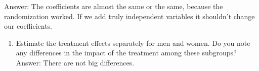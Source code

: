 \documentclass[
]{article}
\newenvironment{Shaded}{\begin{snugshade}}{\end{snugshade}}
\newcommand{\AttributeTok}[1]{\textcolor[rgb]{0.13,0.29,0.53}{#1}}
\newcommand{\CommentTok}[1]{\textcolor[rgb]{0.56,0.35,0.01}{\textit{#1}}}
\newcommand{\ConstantTok}[1]{\textcolor[rgb]{0.56,0.35,0.01}{#1}}
\newcommand{\DecValTok}[1]{\textcolor[rgb]{0.00,0.00,0.81}{#1}}
\newcommand{\FunctionTok}[1]{\textcolor[rgb]{0.13,0.29,0.53}{\textbf{#1}}}
\newcommand{\NormalTok}[1]{#1}
\newcommand{\OtherTok}[1]{\textcolor[rgb]{0.56,0.35,0.01}{#1}}
\newcommand{\SpecialCharTok}[1]{\textcolor[rgb]{0.81,0.36,0.00}{\textbf{#1}}}
\newcommand{\StringTok}[1]{\textcolor[rgb]{0.31,0.60,0.02}{#1}}
\providecommand{\tightlist}{%
  \setlength{\itemsep}{0pt}\setlength{\parskip}{0pt}}
\begin{document}
Answer: The coefficients are almost the same or the same, because the
randomization worked. If we add truly independent variables it shouldn't
change our coefficients.

\begin{enumerate}
\def\labelenumi{\arabic{enumi}.}
\setcounter{enumi}{4}
\tightlist
\item
  Estimate the treatment effects separately for men and women. Do you
  note any differences in the impact of the treatment among these
  subgroups? Answer: There are not big differences.
\end{enumerate}

\begin{Shaded}
\end{Shaded}
\end{document}
